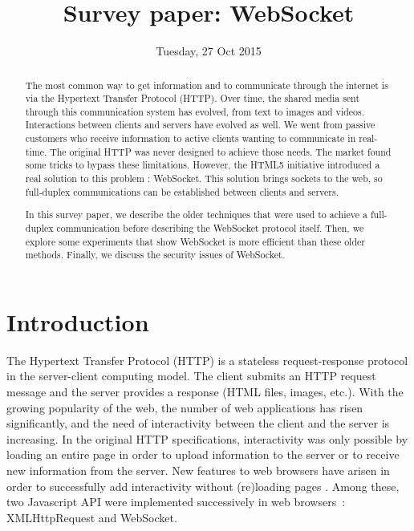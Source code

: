 \documentclass[10pt,journal,compsoc]{IEEEtran}
\newcommand{\ws}{WebSocket}
\begin{document}
\author{}

\title{Survey paper: \ws}

\date{Tuesday, 27 Oct 2015}

\maketitle
\IEEEpeerreviewmaketitle



\begin{abstract}
The most common way to get information and to communicate through the internet is via the Hypertext Transfer Protocol (HTTP).
Over time, the shared media sent through this communication system has evolved, from text to images and videos.
Interactions between clients and servers have evolved as well.
We went from passive customers who receive information to active clients wanting to communicate in real-time.
The original HTTP was never designed to achieve those needs.
The market found some tricks to bypass these limitations.
However, the HTML5 initiative introduced a real solution to this problem : \ws{}.
This solution brings sockets to the web, so full-duplex communications can be established between clients and servers.

In this survey paper, we describe the older techniques that were used to achieve a full-duplex communication before describing the \ws{} protocol itself.
Then, we explore some experiments that show \ws{} is more efficient than these older methods.
Finally, we discuss the security issues of \ws{}.
\end{abstract}


\section{Introduction}

The Hypertext Transfer Protocol (HTTP) is a stateless request-response protocol in the server-client computing model.
The client submits an HTTP request message and the server provides a response (HTML files, images, etc.).
With the growing popularity of the web, the number of web applications has risen significantly, and the need of interactivity between the client and the server is increasing.
In the original HTTP specifications, interactivity was only possible by loading an entire page in order to upload information to the server or to receive new information from the server.
New features to web browsers have arisen in order to successfully add interactivity without (re)loading pages \cite{RealTimeMonitoringUsingAJAXAndWebSockets}.
Among these, two Javascript API were implemented successively in web \mbox{browsers :} XMLHttpRequest and \ws.
\end{document}
